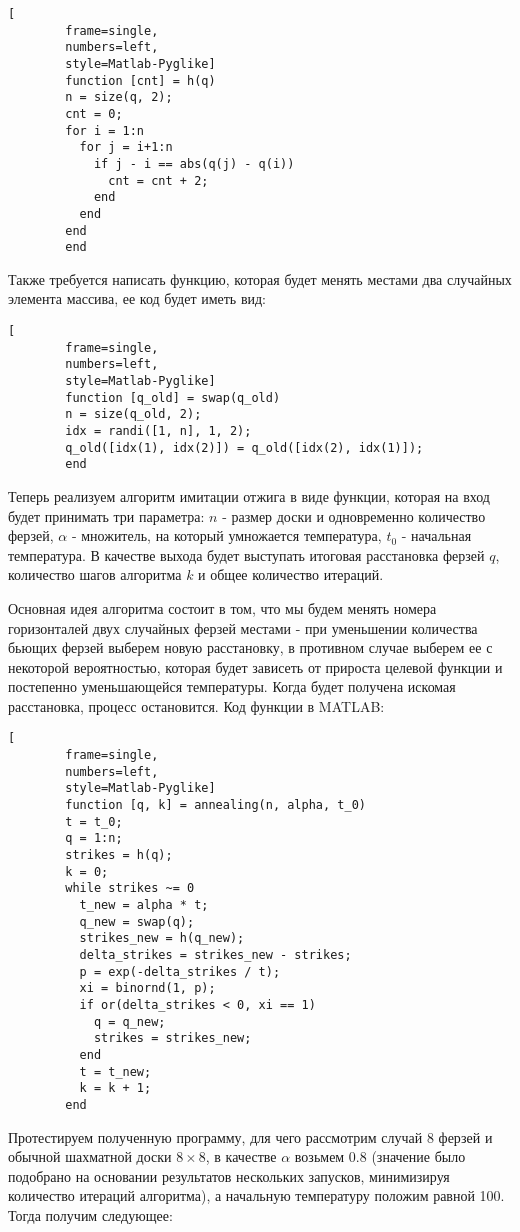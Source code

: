 \documentclass[../main.tex]{subfiles}
\begin{document}
	
	\begin{lstlisting}[
		frame=single,
		numbers=left,
		style=Matlab-Pyglike]
		function [cnt] = h(q)
		n = size(q, 2);
		cnt = 0;
		for i = 1:n
		  for j = i+1:n
		    if j - i == abs(q(j) - q(i))
			  cnt = cnt + 2;
		    end
	 	  end
		end
		end
	\end{lstlisting}

	Также требуется написать функцию, которая будет менять местами два случайных элемента массива, ее код будет иметь вид:
	
	\begin{lstlisting}[
		frame=single,
		numbers=left,
		style=Matlab-Pyglike]
		function [q_old] = swap(q_old)
		n = size(q_old, 2);
		idx = randi([1, n], 1, 2);
		q_old([idx(1), idx(2)]) = q_old([idx(2), idx(1)]);
		end
	\end{lstlisting}
	
	Теперь реализуем алгоритм имитации отжига в виде функции, которая на вход будет принимать три параметра: $n$ - размер доски и одновременно количество ферзей, $\alpha$ - множитель, на который умножается температура, $t_0$ - начальная температура. В качестве выхода будет выступать итоговая расстановка ферзей $q$, количество шагов алгоритма $k$ и общее количество итераций. 
	
	Основная идея алгоритма состоит в том, что мы будем менять номера горизонталей двух случайных ферзей местами -  при уменьшении количества бьющих ферзей выберем новую расстановку, в противном случае выберем ее с некоторой вероятностью, которая будет зависеть от прироста целевой функции и постепенно уменьшающейся температуры. Когда будет получена искомая расстановка, процесс остановится. Код функции в MATLAB: 
	
	\begin{lstlisting}[
		frame=single,
		numbers=left,
		style=Matlab-Pyglike]
		function [q, k] = annealing(n, alpha, t_0)
		t = t_0;
		q = 1:n;
		strikes = h(q);
		k = 0;
		while strikes ~= 0
		  t_new = alpha * t;
		  q_new = swap(q);
		  strikes_new = h(q_new);
		  delta_strikes = strikes_new - strikes;
		  p = exp(-delta_strikes / t);
		  xi = binornd(1, p);
		  if or(delta_strikes < 0, xi == 1)
		    q = q_new;
		    strikes = strikes_new;
		  end
		  t = t_new;
		  k = k + 1;
		end
	\end{lstlisting}

	Протестируем полученную программу, для чего рассмотрим случай 8 ферзей и обычной шахматной доски $8\times 8$, в качестве $\alpha$ возьмем 0.8 (значение было подобрано на основании результатов нескольких запусков, минимизируя количество итераций алгоритма), а начальную температуру положим равной 100. Тогда получим следующее:
	
\end{document}
